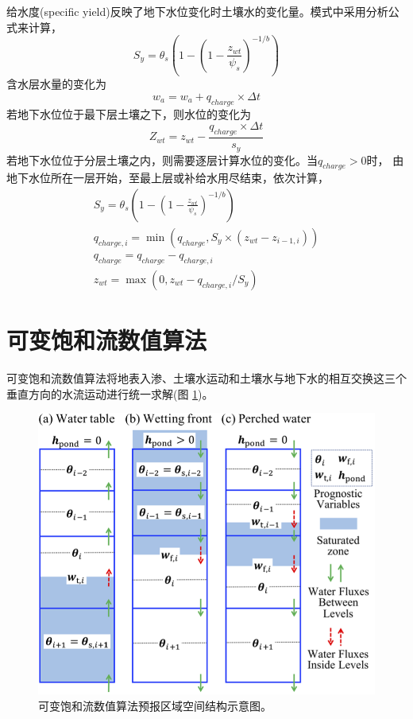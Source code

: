 给水度(specific yield)反映了地下水位变化时土壤水的变化量。模式中采用分析公式来计算，
\begin{equation}
{S}_{{y}}=\theta_{s}\left(1-\left(1-\frac{z_{w t}}{\psi_{s}}\right)^{-1 / b}\right)
\end{equation}
含水层水量的变化为
\begin{equation}
w_{a}=w_{a}+q_{charge} \times \Delta t
\end{equation}
若地下水位位于最下层土壤之下，则水位的变化为
\begin{equation}
Z_{w t}=z_{w t}-\frac{q_{charge} \times \Delta t}{s_{y}}
\end{equation}
若地下水位位于分层土壤之内，则需要逐层计算水位的变化。当$q_{charge}>0$时，
由地下水位所在一层开始，至最上层或补给水用尽结束，依次计算，
\begin{equation}
\begin{array}{c}{S}_{{y}}=\theta_{s}\left(1-\left(1-\frac{z_{w t}}{\psi_{s}}\right)^{-1 / b}\right) \\
     q_{ {charge }, i}=\min \left(q_{ {charge }}, S_{y} \times \left(z_{w t}-z_{i-1, i}\right)\right) \\
      q_{ {charge }}=q_{ {charge }}-q_{ {charge }, i} \\ 
      z_{w t}=\max \left(0, z_{w t}-q_{ {charge }, i} / S_{y}\right)\end{array}
\end{equation}

\section{可变饱和流数值算法}
可变饱和流数值算法将地表入渗、土壤水运动和土壤水与地下水的相互交换这三个垂直方向的水流运动进行统一求解(图 \ref{fig:可变饱和流数值算法预报区域空间结构示意图})。
{
\begin{figure}[]
\centering
\includegraphics{Figures/陆地表面的水分循环/可变饱和流数值算法预报区域空间结构示意图.png}
\caption{可变饱和流数值算法预报区域空间结构示意图。}
\label{fig:可变饱和流数值算法预报区域空间结构示意图}
\end{figure}
}

